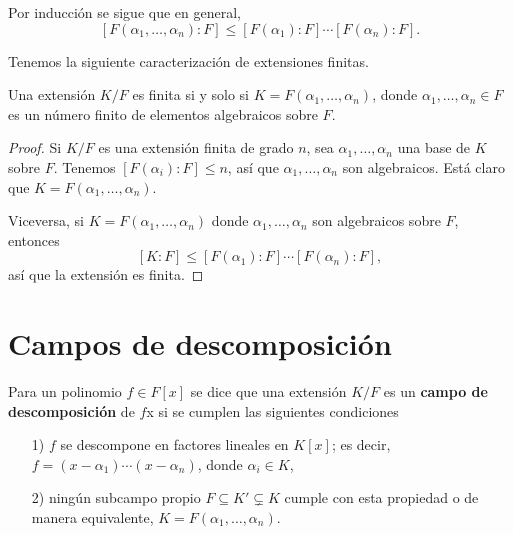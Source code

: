 Por inducción se sigue que en general,
\[ [F (\alpha_1,\ldots,\alpha_n) : F] \le
   [F (\alpha_1) : F]\cdots [F (\alpha_n) : F]. \]

Tenemos la siguiente caracterización de extensiones finitas.

\begin{proposicion}
  Una extensión $K/F$ es finita si y solo si $K = F (\alpha_1,\ldots,\alpha_n)$,
  donde $\alpha_1,\ldots,\alpha_n \in F$ es un número finito de elementos
  algebraicos sobre $F$.

  \begin{proof}
    Si $K/F$ es una extensión finita de grado $n$, sea
    $\alpha_1, \ldots, \alpha_n$ una base de $K$ sobre $F$. Tenemos
    $[F (\alpha_i) : F] \le n$, así que $\alpha_1,\ldots,\alpha_n$ son
    algebraicos. Está claro que $K = F (\alpha_1,\ldots,\alpha_n)$.

    Viceversa, si $K = F (\alpha_1,\ldots,\alpha_n)$ donde
    $\alpha_1,\ldots,\alpha_n$ son algebraicos sobre $F$, entonces
    $$[K : F] \le [F (\alpha_1) : F] \cdots [F (\alpha_n) : F],$$
    así que la extensión es finita.
  \end{proof}
\end{proposicion}


\section{Campos de descomposición}

\begin{definicion}
  Para un polinomio $f \in F[x]$ se dice que una extensión $K/F$ es un
  \textbf{campo de descomposición} de $f$x si se cumplen las siguientes condiciones

  \begin{enumerate}
  \item[1)] $f$ se descompone en factores lineales en $K[x]$; es decir,
    $f = (x - \alpha_1)\cdots (x - \alpha_n)$, donde $\alpha_i \in K$,

  \item[2)] ningún subcampo propio $F \subseteq K' \subsetneq K$ cumple con
    esta propiedad o de manera equivalente,
    $K = F (\alpha_1,\ldots,\alpha_n)$.
  \end{enumerate}
\end{definicion}

